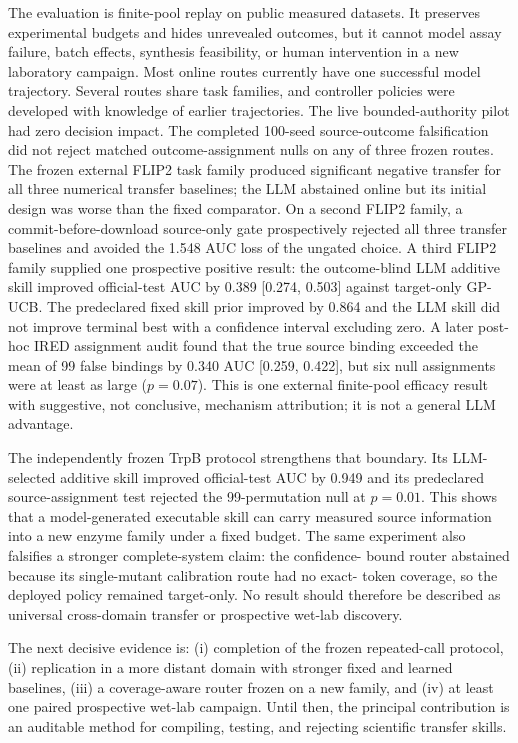 \documentclass[pdflatex,sn-nature]{sn-jnl}
\begin{document}
\begin{appendices}
The evaluation is finite-pool replay on public measured datasets. It preserves
experimental budgets and hides unrevealed outcomes, but it cannot model assay
failure, batch effects, synthesis feasibility, or human intervention in a new
laboratory campaign. Most online routes currently have one successful model
trajectory. Several routes share task families, and controller policies were
developed with knowledge of earlier trajectories. The live bounded-authority
pilot had zero decision impact. The completed 100-seed source-outcome
falsification did not reject matched outcome-assignment nulls on any of three
frozen routes. The frozen external FLIP2 task family produced significant
negative transfer for all three numerical transfer baselines; the LLM
abstained online but its initial design was worse than the fixed comparator.
On a second FLIP2 family, a commit-before-download source-only gate
prospectively rejected all three transfer baselines and avoided the 1.548 AUC
loss of the ungated choice. A third FLIP2 family supplied one prospective
positive result: the outcome-blind LLM additive skill improved official-test
AUC by 0.389 [0.274, 0.503] against target-only GP-UCB. The predeclared fixed
skill prior improved by 0.864 and the LLM skill did not improve terminal best
with a confidence interval excluding zero. A later post-hoc IRED assignment
audit found that the true source binding exceeded the mean of 99 false bindings
by 0.340 AUC [0.259, 0.422], but six null assignments were at least as large
($p=0.07$). This is one external finite-pool efficacy result with suggestive,
not conclusive, mechanism attribution; it is not a general LLM advantage.

The independently frozen TrpB protocol strengthens that boundary. Its
LLM-selected additive skill improved official-test AUC by 0.949 and its
predeclared source-assignment test rejected the 99-permutation null at
$p=0.01$. This shows that a model-generated executable skill can carry measured
source information into a new enzyme family under a fixed budget. The same
experiment also falsifies a stronger complete-system claim: the confidence-
bound router abstained because its single-mutant calibration route had no exact-
token coverage, so the deployed policy remained target-only. No result should
therefore be described as universal
cross-domain transfer or prospective wet-lab discovery.

The next decisive evidence is: (i) completion of the frozen repeated-call
protocol, (ii) replication in a more distant domain with stronger fixed and
learned baselines, (iii) a coverage-aware router frozen on a new family, and
(iv) at least one paired
prospective wet-lab campaign. Until then, the principal contribution is an auditable
method for compiling, testing, and rejecting scientific transfer skills.

\end{appendices}
\end{document}
